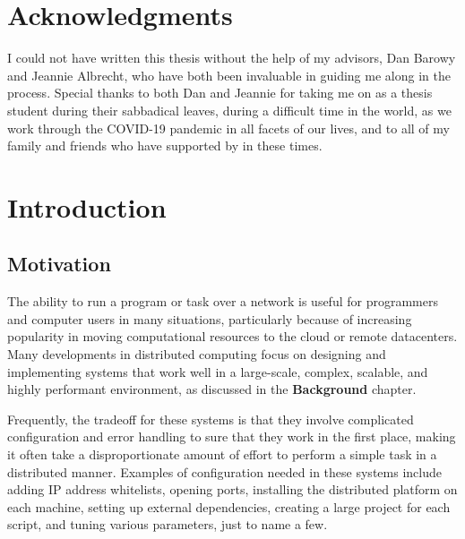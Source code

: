 \documentclass[twoside]{report}
\newcommand{\todoi}[1]{\todo[inline, color=blue!20]{TODO: {#1}}}
\begin{document}
\chapter*{Acknowledgments}

I could not have written this thesis without the help of my advisors, Dan Barowy and Jeannie Albrecht, who have both been invaluable in guiding me along in the process. Special thanks to both Dan and Jeannie for taking me on as a thesis student during their sabbadical leaves, during a difficult time in the world, as we work through the COVID-19 pandemic in all facets of our lives, and to all of my family and friends who have supported by in these times.



\chapter{Introduction}

\section{Motivation}

The ability to run a program or task over a network is useful for programmers and computer users in many situations, particularly because of increasing popularity in moving computational resources to the cloud or remote datacenters.
Many developments in distributed computing focus on designing and implementing systems that work well in a large-scale, complex, scalable, and highly performant environment, as discussed in the \textbf{Background} chapter.

Frequently, the tradeoff for these systems is that they involve  complicated configuration and error handling to sure that they work in the first place, making it often take a disproportionate amount of effort to perform a simple task in a distributed manner.
Examples of configuration needed in these systems include adding IP address whitelists, opening ports, installing the distributed platform on each machine, setting up external dependencies, creating a large project for each script, and tuning various parameters, just to name a few.
\end{document}
